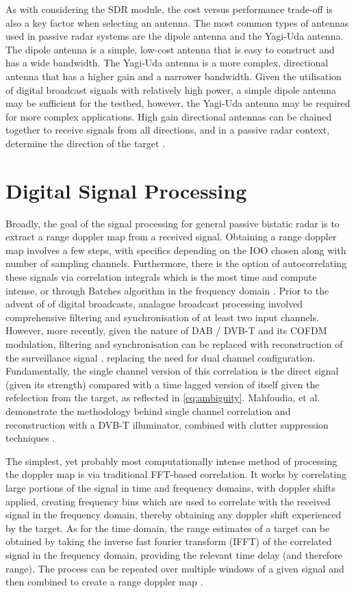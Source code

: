 As with considering the SDR module, the cost versus performance trade-off is also a key factor when selecting an antenna. The most common types of antennas used in passive radar systems are the dipole antenna and the Yagi-Uda antenna. The dipole antenna is a simple, low-cost antenna that is easy to construct and has a wide bandwidth. The Yagi-Uda antenna is a more complex, directional antenna that has a higher gain and a narrower bandwidth. Given the utilisation of digital broadcast signals with relatively high power, a simple dipole antenna may be sufficient for the testbed, however, the Yagi-Uda antenna may be required for more complex applications. High gain directional antennas can be chained together to receive signals from all directions, and in a passive radar context, determine the direction of the target \cite{KrakenSDR}.


\section{Digital Signal Processing}
Broadly, the goal of the signal processing for general passive bistatic radar is to extract a range doppler map from a received signal. Obtaining a range doppler map involves a few steps, with specifics depending on the IOO chosen along with number of sampling channels. Furthermore, there is the option of autocorrelating these signals via correlation integrals which is the most time and compute intense, or through Batches algorithm in the frequency domain . Prior to the advent of of digital broadcasts, analague broadcast processing involved comprehensive filtering and synchronisation of at least two input channels\cite{DSPfm}. However, more recently, given the nature of DAB / DVB-T and its COFDM modulation, filtering and synchronisation can be replaced with reconstruction of the surveillance signal \cite{DSPdab}, replacing the need for dual channel configuration. Fundamentally, the single channel version of this correlation is the direct signal (given its strength) compared with a time lagged version of itself given the refelection from the target, as reflected in \ref{eq:ambiguity}. Mahfoudia, et al. demonstrate the methodology behind single channel correlation and reconstruction with a DVB-T illuminator, combined with clutter suppression techniques \cite{singleChannel}.


The simplest, yet probably most computationally intense method of processing the doppler map is via traditional FFT-based correlation. It works by correlating large portions of the signal in time and frequency domains, with doppler shifts applied, creating frequency bins which are used to correlate with the received signal in the frequency domain, thereby obtaining any doppler shift experienced by the target. As for the time domain, the range estimates of a target can be obtained by taking the inverse fast fourier transform (IFFT) of the correlated signal in the frequency domain, providing the relevant time delay (and therefore range). The process can be repeated over multiple windows of a given signal and then combined to create a range doppler map \cite{FFTcorrelation}.

